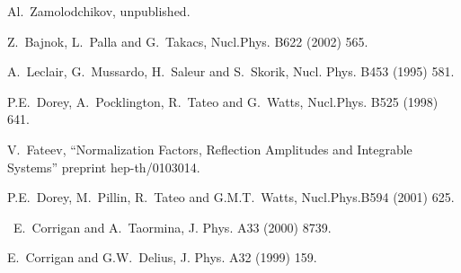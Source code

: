\documentclass[a4paper,12pt,titlepage,final]{article}
\begin{document}
\begin{thebibliography}{99}
  Al.\ Zamolodchikov, unpublished.

   Z.\ Bajnok, L.\ Palla and G.\ Takacs, Nucl.Phys. B622
(2002) 565.

  A.\ Leclair, G.\ Mussardo, H.\ Saleur and S.\ Skorik,
Nucl. Phys.
B453 (1995) 581.

  P.E.\ Dorey, A.\ Pocklington, R.\ Tateo and G.\ Watts,
Nucl.Phys. B525 (1998) 641.

  V.\ Fateev, ``Normalization Factors, Reflection
Amplitudes and
Integrable Systems'' preprint hep-th/0103014.

  P.E.\ Dorey, M.\ Pillin, R.\ Tateo and G.M.T.\ Watts,
Nucl.Phys.B594
(2001) 625.

  \ E.\ Corrigan and A.\ Taormina, J. Phys. A33 (2000) 8739.

  E.\ Corrigan and G.W.\ Delius, J. Phys. A32 (1999) 159.
\end{thebibliography}
\end{document}
